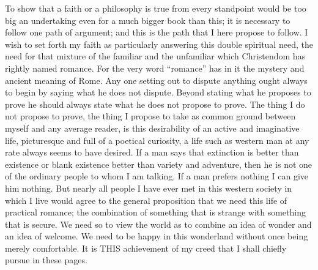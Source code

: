 To show that a faith or a philosophy is true from every standpoint would be too big an undertaking even for a much bigger book than this; it is necessary to follow one path of argument; and this is the path that I here propose to follow. I wish to set forth my faith as particularly answering this double spiritual need, the need for that mixture of the familiar and the unfamiliar which Christendom has rightly named romance. For the very word “romance” has in it the mystery and ancient meaning of Rome. Any one setting out to dispute anything ought always to begin by saying what he does not dispute. Beyond stating what he proposes to prove he should always state what he does not propose to prove. The thing I do not propose to prove, the thing I propose to take as common ground between myself and any average reader, is this desirability of an active and imaginative life, picturesque and full of a poetical curiosity, a life such as western man at any rate always seems to have desired. If a man says that extinction is better than existence or blank existence better than variety and adventure, then he is not one of the ordinary people to whom I am talking. If a man prefers nothing I can give him nothing. But nearly all people I have ever met in this western society in which I live would agree to the general proposition that we need this life of practical romance; the combination of something that is strange with something that is secure. We need so to view the world as to combine an idea of wonder and an idea of welcome. We need to be happy in this wonderland without once being merely comfortable. It is THIS achievement of my creed that I shall chiefly pursue in these pages.

